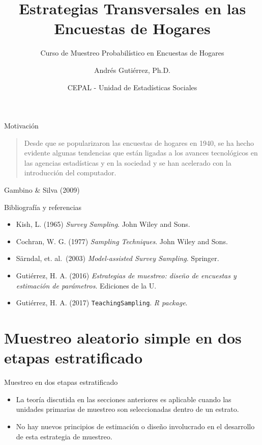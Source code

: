 \documentclass[
  english,
  ignorenonframetext,
]{beamer}
\title{Estrategias Transversales en las Encuestas de Hogares}
\subtitle{Curso de Muestreo Probabilístico en Encuestas de Hogares}
\author{Andrés Gutiérrez, Ph.D.}
\date{CEPAL - Unidad de Estadísticas Sociales}
\providecommand{\tightlist}{%
  \setlength{\itemsep}{0pt}\setlength{\parskip}{0pt}}
\begin{document}
\frame{\titlepage}

\begin{frame}[allowframebreaks]
  \tableofcontents[hideallsubsections]
\end{frame}
\begin{frame}{Motivación}
\protect\hypertarget{motivaciuxf3n}{}
\begin{quote}
Desde que se popularizaron las encuestas de hogares en 1940, se ha hecho
evidente algunas tendencias que están ligadas a los avances tecnológicos
en las agencias estadísticas y en la sociedad y se han acelerado con la
introducción del computador.
\end{quote}

Gambino \& Silva (2009)
\end{frame}

\begin{frame}[fragile]{Bibliografía y referencias}
\protect\hypertarget{bibliografuxeda-y-referencias}{}
\begin{itemize}
\tightlist
\item
  Kish, L. (1965) \emph{Survey Sampling}. John Wiley and Sons.
\item
  Cochran, W. G. (1977) \emph{Sampling Techniques}. John Wiley and Sons.
\item
  Särndal, et. al.~(2003) \emph{Model-assisted Survey Sampling}.
  Springer.
\item
  Gutiérrez, H. A. (2016) \emph{Estrategias de muestreo: diseño de
  encuestas y estimación de parámetros}. Ediciones de la U.
\item
  Gutiérrez, H. A. (2017) \texttt{TeachingSampling}. \emph{R package}.
\end{itemize}
\end{frame}

\hypertarget{muestreo-aleatorio-simple-en-dos-etapas-estratificado}{%
\section{Muestreo aleatorio simple en dos etapas
estratificado}\label{muestreo-aleatorio-simple-en-dos-etapas-estratificado}}

\begin{frame}{Muestreo en dos etapas estratificado}
\protect\hypertarget{muestreo-en-dos-etapas-estratificado}{}
\begin{itemize}
\tightlist
\item
  La teoría discutida en las secciones anteriores es aplicable cuando
  las unidades primarias de muestreo son seleccionadas dentro de un
  estrato.
\item
  No hay nuevos principios de estimación o diseño involucrado en el
  desarrollo de esta estrategia de muestreo.
\end{itemize}
\end{frame}
\end{document}
